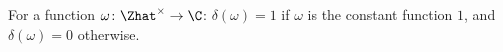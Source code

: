 For a function $\omega\colon\Zhat^\times\to\C$: $\delta(\omega)=1$ if $\omega$ is the constant function $1$, and $\delta(\omega)=0$ otherwise.
